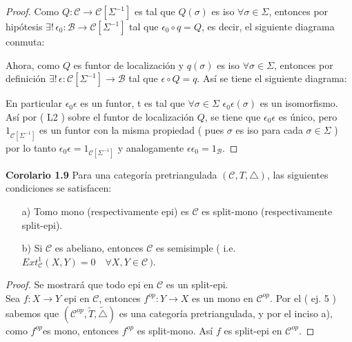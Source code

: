 \documentclass{article}
\begin{document}
\begin{enumerate}
\begin{proof}
Como $Q:\mathscr{C}\to\mathscr{C}[\Sigma^{-1}]$ es tal que $Q(\sigma)$ es iso $\forall \sigma \in \Sigma$, entonces por 
hipótesis $\exists !\,\epsilon_0:\mathscr{B}\to \mathscr{C}[\Sigma^{-1}]$ tal que $\epsilon_0\circ q=Q$, es decir, el siguiente diagrama conmuta:\\
\centerline{
}
Ahora, como $Q$ es funtor de localización y $q(\sigma)$ es iso $\forall \sigma\in \Sigma$, entonces por definición 
$\exists !\,\epsilon:\mathscr{C}[\Sigma^{-1}]\to \mathscr{B}$ tal que $\epsilon\circ Q=q$. Así se tiene el siguiente diagrama:\\
\centerline{
}

En particular $\epsilon_0\epsilon$ es un funtor, t es tal que $\forall \sigma\in \Sigma$ $\epsilon_0\epsilon(\sigma)$ es un isomorfismo. Así por ( L2 )
sobre el funtor de localización $Q$, se tiene que $\epsilon_0\epsilon$ es único, pero $1_{\mathscr{C}[\Sigma^{-1}]}$ es un funtor con la misma
propiedad ( pues $\sigma$ es iso para cada $\sigma \in \Sigma$  ) por lo tanto $\epsilon_0\epsilon=1_{\mathscr{C}[\Sigma^{-1}]}$ y analogamente
$\epsilon\epsilon_0=1_{\mathscr{B}}$.
\end{proof}

\textbf{Corolario 1.9} Para una categoría pretriangulada $(\mathscr{C},T,\triangle)$, las siguientes condiciones se satisfacen:
\begin{itemize}
\item[a)] Tomo mono (respectivamente epi) es $\mathscr{C}$ es split-mono (respectivamente split-epi).
\item[b)] Si $\mathscr{C}$ es abeliano, entonces $\mathscr{C}$ es semisimple ( i.e. \\ $Ext^{1}_\mathscr{C}(X,Y)=0\quad \forall X,Y\in \mathscr{C}\,)$.
\end{itemize}
\begin{proof}
Se mostrará que todo epi en $\mathscr{C}$ es un split-epi.\\

Sea $f:X\to Y$ epi en $\mathscr{C}$, entonces $f^{op}:Y\to X$ es un mono en $\mathscr{C}^{op}$. Por el ( ej. 5 ) sabemos que 
$(\mathscr{C}^{op},\tilde{T},\tilde{\triangle})$ es una categoría pretriangulada, y por el inciso a), como $f^{op}$es mono, entonces $f^{op}$ es 
split-mono. Así $f$ es split-epi en $\mathscr{C}^{op}$.
\end{proof}


\end{enumerate}		
\end{document}
